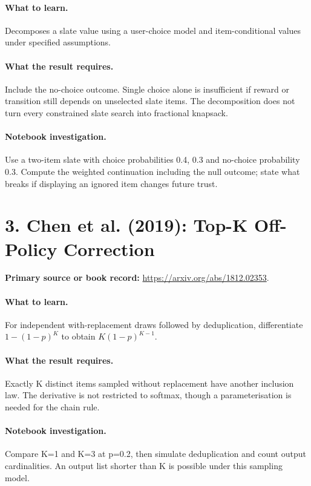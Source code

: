 \documentclass[11pt]{scrartcl}
\begin{document}
\paragraph{What to learn.} Decomposes a slate value using a user-choice model and item-conditional values under specified assumptions.

\paragraph{What the result requires.} Include the no-choice outcome. Single choice alone is insufficient if reward or transition still depends on unselected slate items. The decomposition does not turn every constrained slate search into fractional knapsack.

\paragraph{Notebook investigation.} Use a two-item slate with choice probabilities 0.4, 0.3 and no-choice probability 0.3. Compute the weighted continuation including the null outcome; state what breaks if displaying an ignored item changes future trust.

\section*{3. Chen et al. (2019): Top-K Off-Policy Correction}
\textbf{Primary source or book record:} \url{https://arxiv.org/abs/1812.02353}.

\paragraph{What to learn.} For independent with-replacement draws followed by deduplication, differentiate $1-(1-p)^K$ to obtain $K(1-p)^{K-1}$.

\paragraph{What the result requires.} Exactly K distinct items sampled without replacement have another inclusion law. The derivative is not restricted to softmax, though a parameterisation is needed for the chain rule.

\paragraph{Notebook investigation.} Compare K=1 and K=3 at p=0.2, then simulate deduplication and count output cardinalities. An output list shorter than K is possible under this sampling model.
\end{document}
